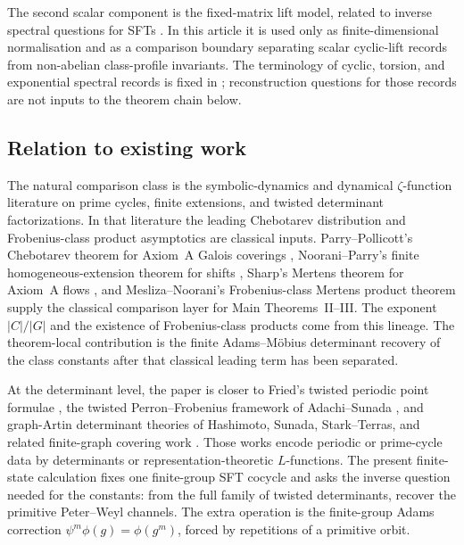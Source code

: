 \documentclass[11pt,a4paper]{amsart}
\theoremstyle{plain}
\theoremstyle{definition}
\theoremstyle{remark}
\begin{document}
The second scalar component is the fixed-matrix lift model, related to inverse
spectral questions for SFTs \cite{LindMarcus1995}.  In this article it is used
only as finite-dimensional normalisation and as a comparison boundary separating
scalar cyclic-lift records from non-abelian class-profile invariants.  The
terminology of cyclic, torsion, and exponential spectral records is fixed in
; reconstruction questions for those records
are not inputs to the theorem chain below.

\subsection{Relation to existing work}

The natural comparison class is the symbolic-dynamics and dynamical
\(\zeta\)-function literature on prime cycles, finite extensions, and
twisted determinant factorizations.  In that literature the leading
Chebotarev distribution and Frobenius-class product asymptotics are
classical inputs.  Parry--Pollicott's Chebotarev theorem for Axiom~A
Galois coverings \cite{ParryPollicott1986Chebotarev}, Noorani--Parry's
finite homogeneous-extension theorem for shifts
\cite{NooraniParry1992ChebotarevShifts}, Sharp's Mertens theorem for
Axiom~A flows \cite{Sharp1991Mertens}, and Mesliza--Noorani's
Frobenius-class Mertens product theorem
\cite{MeslizaNoorani1999FrobeniusMertens} supply the classical comparison layer
for Main Theorems~II--III.  The exponent \(|C|/|G|\) and the existence of
Frobenius-class products come from this lineage.  The theorem-local
contribution is the finite Adams--M\"obius determinant recovery of the class
constants after that classical leading term has been separated.

At the determinant level, the paper is closer to Fried's twisted periodic
point formulae \cite{Fried1983PeriodicPointsTwistedCoefficients,Fried1983HomologicalIdentitiesClosedOrbits}, the twisted
Perron--Frobenius framework of Adachi--Sunada
\cite{AdachiSunada1987TwistedPF}, and graph-Artin determinant theories of
Hashimoto, Sunada, Stark--Terras, and related finite-graph covering work
\cite{Hashimoto1989ZetaFiniteGraphs,Hashimoto1990ZetaLFunctionsFiniteGraphs,Hashimoto1992ArtinDensityPrimeCycles,Sunada1986LFunctionsGeometry,StarkTerras1996FiniteGraphsCoverings,StarkTerras2000FiniteGraphsCoveringsII,StarkTerras2007FiniteGraphsCoveringsIII}.  Those works encode periodic
or prime-cycle data by determinants or representation-theoretic
\(L\)-functions.  The present finite-state calculation fixes one
finite-group SFT cocycle and asks the inverse question needed for the
constants: from the full family of twisted determinants, recover the
primitive Peter--Weyl channels.  The extra operation is the finite-group
Adams correction \(\psi^m\phi(g)=\phi(g^m)\), forced by repetitions of a
primitive orbit.
\end{document}
